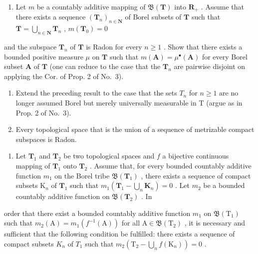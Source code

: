 \begin{enumerate}
\def\labelenumi{\alph{enumi})}
\tightlist
\item
  Let \(m\) be a countably additive mapping of \(\mathfrak{B}(\mathbf{T})\) into \(\mathbf{R}_+\) . Assume that there exists a sequence \((\mathbf{T}_n)_{n\in \mathbf{N}}\) of Borel subsets of \(\mathbf{T}\) such that \(\mathbf{T} = \bigcup_{n\in \mathbf{N}}\mathbf{T}_n\) , \(m(\mathbf{T}_0) = 0\)
\end{enumerate}

and the subspace \(\mathbf{T}_n\) of \(\mathbf{T}\) is Radon for every \(n \geqslant 1\) . Show that there exists a bounded positive measure \(\mu\) on \(\mathbf{T}\) such that \(m(\mathbf{A}) = \mu^{\bullet}(\mathbf{A})\) for every Borel subset \(\mathbf{A}\) of \(\mathbf{T}\) (one can reduce to the case that the \(\mathbf{T}_n\) are pairwise disjoint on applying the Cor. of Prop. 2 of No.~3).

\begin{enumerate}
\def\labelenumi{\alph{enumi})}
\setcounter{enumi}{1}
\item
  Extend the preceding result to the case that the sets \(T_{n}\) for \(n \geqslant 1\) are no longer assumed Borel but merely universally measurable in T (argue as in Prop. 2 of No.~3).
\item
  Every topological space that is the union of a sequence of metrizable compact subspaces is Radon.
\end{enumerate}

\begin{enumerate}
\def\labelenumi{\arabic{enumi})}
\setcounter{enumi}{17}
\tightlist
\item
  Let \(\mathbf{T}_1\) and \(\mathbf{T}_2\) be two topological spaces and \(f\) a bijective continuous mapping of \(\mathbf{T}_1\) onto \(\mathbf{T}_2\) . Assume that, for every bounded countably additive function \(m_1\) on the Borel tribe \(\mathfrak{B}(\mathbf{T}_1)\) , there exists a sequence of compact subsets \(\mathrm{K}_n\) of \(\mathbf{T}_1\) such that \(m_1(\mathbf{T}_1 - \bigcup_{n}\mathbf{K}_n) = 0\) . Let \(m_2\) be a bounded countably additive function on \(\mathfrak{B}(\mathbf{T}_2)\) . In
\end{enumerate}

order that there exist a bounded countably additive function \(m_{1}\) on \(\mathfrak{B}(\mathrm{T}_{1})\) such that \(m_{2}(\mathrm{A}) = m_{1}(f^{-1}(\mathrm{A}))\) for all \(\mathrm{A} \in \mathfrak{B}(\mathrm{T}_{2})\) , it is necessary and sufficient that the following condition be fulfilled: there exists a sequence of compact subsets \(K_{n}\) of \(T_{1}\) such that \(m_{2}(\mathrm{T}_{2} - \bigcup_{n} f(\mathrm{K}_{n})) = 0\) .

